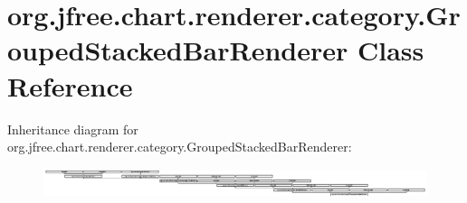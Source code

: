 \hypertarget{classorg_1_1jfree_1_1chart_1_1renderer_1_1category_1_1_grouped_stacked_bar_renderer}{}\section{org.\+jfree.\+chart.\+renderer.\+category.\+Grouped\+Stacked\+Bar\+Renderer Class Reference}
\label{classorg_1_1jfree_1_1chart_1_1renderer_1_1category_1_1_grouped_stacked_bar_renderer}
Inheritance diagram for org.\+jfree.\+chart.\+renderer.\+category.\+Grouped\+Stacked\+Bar\+Renderer\+:\begin{figure}[H]
\begin{center}
\leavevmode
\includegraphics[height=0.865979cm]{classorg_1_1jfree_1_1chart_1_1renderer_1_1category_1_1_grouped_stacked_bar_renderer}
\end{center}
\end{figure}
